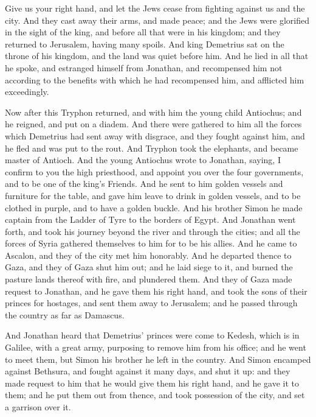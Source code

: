 {Give us your right hand, and let the Jews cease from fighting against us and the city.
And they cast away their arms, and made peace; and the Jews were glorified in the sight of the king, and before all that were in his kingdom; and they returned to Jerusalem, having many spoils.
And king Demetrius sat on the throne of his kingdom, and the land was quiet before him.
And he lied in all that he spoke, and estranged himself from Jonathan, and recompensed him not according to the benefits with which he had recompensed him, and afflicted him exceedingly.
\par }{\PP {}Now after this Tryphon returned, and with him the young child Antiochus; and he reigned, and put on a diadem.
And there were gathered to him all the forces which Demetrius had sent away with disgrace, and they fought against him, and he fled and was put to the rout.
And Tryphon took the elephants, and became master of Antioch.
And the young Antiochus wrote to Jonathan, saying, I confirm to you the high priesthood, and appoint you over the four governments, and to be one of the king’s
 Friends.
And he sent to him golden vessels and furniture for the table, and gave him leave to drink in golden vessels, and to be clothed in purple, and to have a golden buckle.
And his brother Simon he made captain from the Ladder of Tyre to the borders of Egypt.
And Jonathan went forth, and took his journey beyond the river and through the cities; and all the forces of Syria gathered themselves to him for to be his allies. And he came to Ascalon, and they of the city met him honorably.
And he departed thence to Gaza, and they of Gaza shut him out; and he laid siege to it, and burned the pasture lands thereof with fire, and plundered them.
And they of Gaza made request to Jonathan, and he gave them his right hand, and took the sons of their princes for hostages, and sent them away to Jerusalem; and he passed through the country as far as Damascus.
\par }{\PP {}And Jonathan heard that Demetrius’ princes were come to Kedesh, which is in Galilee, with a great army, purposing to remove him from his office;
and he went to meet them, but Simon his brother he left in the country.
And Simon encamped against Bethsura, and fought against it many days, and shut it up:
and they made request to him that he would give them his right hand, and he gave it to them; and he put them out from thence, and took possession of the city, and set a garrison over it.
}
